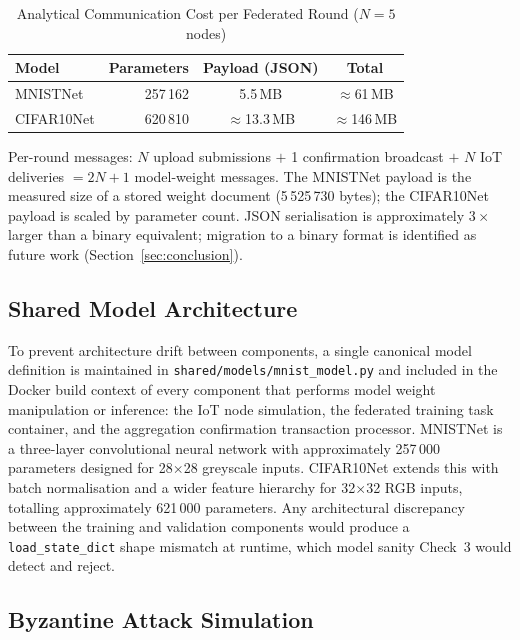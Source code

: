 \documentclass[lettersize,journal]{IEEEtran}
\begin{document}
\begin{table}[t]
\centering
\caption{Analytical Communication Cost per Federated Round ($N = 5$ nodes)}
\label{tab:commcost}
\begin{tabular}{lrcc}
\toprule
Model & Parameters & Payload (JSON) & Total \\
\midrule
MNISTNet   & 257\,162 & 5.5\,MB  & $\approx$61\,MB \\
CIFAR10Net & 620\,810 & $\approx$13.3\,MB & $\approx$146\,MB \\
\bottomrule
\end{tabular}
\vspace{2pt}

{\footnotesize
Per-round messages: $N$ upload submissions $+$ 1 confirmation broadcast $+$ $N$
IoT deliveries $= 2N + 1$ model-weight messages. The MNISTNet payload is the measured
size of a stored weight document (5\,525\,730 bytes); the CIFAR10Net payload is scaled
by parameter count. JSON serialisation is approximately
$3\times$ larger than a binary equivalent; migration to a binary format is identified
as future work (Section~\ref{sec:conclusion}).
}
\end{table}

\subsection{Shared Model Architecture}

To prevent architecture drift between components, a single canonical model definition
is maintained in \texttt{shared/models/mnist\_model.py} and included in the Docker build
context of every component that performs model weight manipulation or inference: the IoT
node simulation, the federated training task container, and the aggregation confirmation
transaction processor. MNISTNet is a three-layer convolutional neural network with
approximately 257\,000 parameters designed for 28$\times$28 greyscale inputs.
CIFAR10Net extends this with batch normalisation and a wider feature hierarchy for
32$\times$32 RGB inputs, totalling approximately 621\,000 parameters. Any architectural
discrepancy between the training and validation components would produce a
\texttt{load\_state\_dict} shape mismatch at runtime, which model sanity Check~3 would
detect and reject.

\subsection{Byzantine Attack Simulation}
\end{document}
